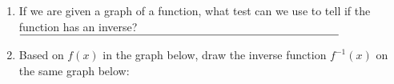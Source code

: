 \documentclass[11pt]{article}
\begin{document}
\begin{enumerate}
\item If we are given a graph of a function, what test can we use to tell if the function has an inverse? $\rule{10cm}{0.15mm}$ \\

\item Based on $f(x)$ in the graph below, draw the inverse function $f^{-1}(x)$ on the same graph below:

\begin{center}
\end{center}

\end{enumerate}
\end{document}
